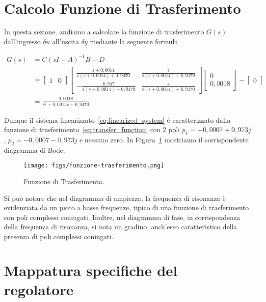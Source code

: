 \documentclass[a4paper, 11pt]{article}
\begin{document}
\newpage
\section{Calcolo Funzione di Trasferimento}

In questa sezione, andiamo a calcolare la funzione di trasferimento $G(s)$ dall'ingresso $\delta u$ all'uscita $\delta y$ mediante la seguente formula 

\begin{align}\label{eq:transfer_function}
G(s) &= C(sI-A)^{-1}B - D   \nonumber
\\ &= \begin{bmatrix}
    1 & 0
\end{bmatrix}
\begin{bmatrix}
    \frac{s+0,0014}{s(s+0,0014)+0,9470} &
    \frac{1}{s(s+0,0014)+0,9470} \\
    -\frac{0,947}{s(s+0,0014)+0,9470} &
    \frac{s}{s(s+0,0014)+0,9470}
\end{bmatrix}
\begin{bmatrix}
    0 \\ 0,0018
\end{bmatrix}-
\begin{bmatrix}
    0
\end{bmatrix} \nonumber
\\ &= \frac{0,0018}{s^2+0,0014s+0,9470} 
\end{align}

Dunque il sistema linearizzato~\eqref{eq:linearized_system} è caratterizzato dalla funzione di trasferimento~\eqref{eq:transfer_function} con $2$ poli $p_1 = -0,0007 + 0,973j$, $p_2 = -0,0007 - 0,973j$ e nessuno zero. In Figura~\ref{G_s} mostriamo il corrispondente diagramma di Bode.

\begin{figure}[H]
    \centering
    \texttt{[image: figs/funzione-trasferimento.png]}
    \caption{Funzione di Trasferimento.}
    \label{G_s}
\end{figure}

Si può notare che nel diagramma di ampiezza, la frequenza di risonanza è evidenziata da un picco a basse frequenze, tipico di una funzione di trasferimento con poli complessi coniugati. Inoltre, nel diagramma di fase, in corrispondenza della frequenza di risonanza, si nota un gradino, anch'esso caratteristico della presenza di poli complessi coniugati.

\newpage
\section{Mappatura specifiche del regolatore}
\label{sec:specifications}
\end{document}

